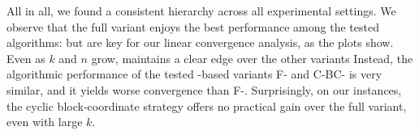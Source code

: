 \documentclass[twoside]{article}
\begin{document}
%
All in all, we found a consistent hierarchy across all experimental settings. 
We observe that the full \AFW{} variant enjoys the best performance among the tested algorithms:
but are key for our linear convergence analysis, as the plots show.
Even as 
$k$ and $n$ grow, \AFW{} maintains a clear edge over the other variants
Instead, the algorithmic performance of the tested \FW{}-based variants F-\FW{} and C-BC-\FW{} is very similar, and it yields worse convergence than F-\AFW{}. 
Surprisingly, on our instances, the cyclic block‑coordinate \FW{} strategy offers no practical gain over the full \FW{} variant, even with large $k$.
\end{document}
